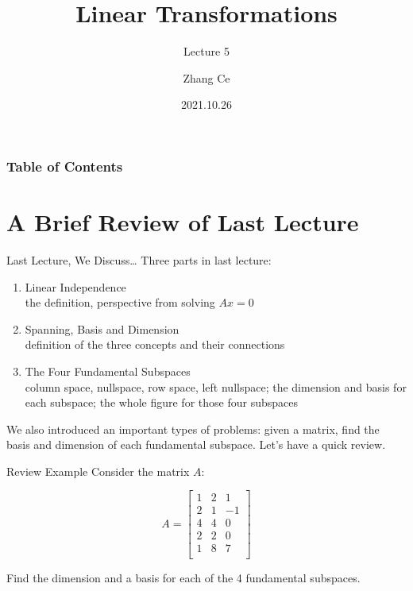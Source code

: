 \documentclass{beamer}
\title[Linear Algebra] %
{Linear Transformations}
\subtitle{Lecture 5}
\author[11910803@mail.sustech.edu.cn] %
{
    Zhang Ce
}
\institute[] %
{
    Department of Electrical and Electronic Engineering\\
    Southern University of Science and Technology
}
\date[2022.3.29] %
{2021.10.26}
\begin{document}
\frame{\titlepage}


\begin{frame}
\frametitle{Table of Contents}
\tableofcontents
\end{frame}

\section{A Brief Review of Last Lecture}
\begin{frame}{Last Lecture, We Discuss\dots}
Three parts in last lecture:
    \begin{enumerate}
        \item Linear Independence\\
        the definition, perspective from solving $Ax=0$
        \item Spanning, Basis and Dimension\\
        definition of the three concepts and their connections
        \item The Four Fundamental Subspaces\\
        column space, nullspace, row space, left nullspace; the dimension and basis for each subspace; the whole figure for those four subspaces
    \end{enumerate}

We also introduced an important types of problems: given a matrix, find the basis and dimension of each fundamental subspace. Let's have a quick review.
\end{frame}

\begin{frame}{Review Example}
Consider the matrix $A$:

\begin{equation*}
    A=\left[ \begin{matrix}
        1&		2&		1\\
        2&		1&		-1\\
        4&		4&		0\\
        2&		2&		0\\
        1&		8&		7\\
    \end{matrix} \right]
\end{equation*}

\vspace{3pt}
Find the dimension and a basis for each of the 4 fundamental subspaces.

\end{frame}
\end{document}
